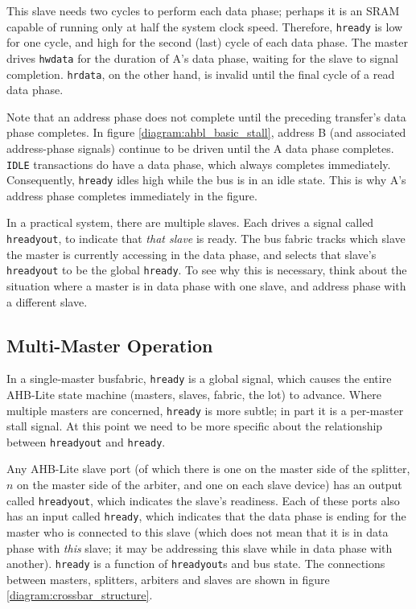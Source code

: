 \documentclass[notitlepage]{article}
\begin{document}
This slave needs two cycles to perform each data phase; perhaps it is an SRAM capable of running only at half the system clock speed. Therefore, \texttt{hready} is low for one cycle, and high for the second (last) cycle of each data phase. The master drives \texttt{hwdata} for the duration of A's data phase, waiting for the slave to signal completion. \texttt{hrdata}, on the other hand, is invalid until the final cycle of a read data phase.

Note that an address phase does not complete until the preceding transfer's data phase completes. In figure \ref{diagram:ahbl_basic_stall}, address B (and associated address-phase signals) continue to be driven until the A data phase completes. \texttt{IDLE} transactions do have a data phase, which always completes immediately. Consequently, \texttt{hready} idles high while the bus is in an idle state. This is why A's address phase completes immediately in the figure.

In a practical system, there are multiple slaves. Each drives a signal called \texttt{hreadyout}, to indicate that \textit{that slave} is ready. The bus fabric tracks which slave the master is currently accessing in the data phase, and selects that slave's \texttt{hreadyout} to be the global \texttt{hready}. To see why this is necessary, think about the situation where a master is in data phase with one slave, and address phase with a different slave.

\subsection{Multi-Master Operation}

In a single-master busfabric, \texttt{hready} is a global signal, which causes the entire AHB-Lite state machine (masters, slaves, fabric, the lot) to advance. Where multiple masters are concerned, \texttt{hready} is more subtle; in part it is a per-master stall signal. At this point we need to be more specific about the relationship between \texttt{hreadyout} and \texttt{hready}.

Any AHB-Lite slave port (of which there is one on the master side of the splitter, $n$ on the master side of the arbiter, and one on each slave device) has an output called \texttt{hreadyout}, which indicates the slave's readiness. Each of these ports also has an input called \texttt{hready}, which indicates that the data phase is ending for the master who is connected to this slave (which does not mean that it is in data phase with \textit{this} slave; it may be addressing this slave while in data phase with another). \texttt{hready} is a function of \texttt{hreadyout}s and bus state. The connections between masters, splitters, arbiters and slaves are shown in figure \ref{diagram:crossbar_structure}.
\end{document}
